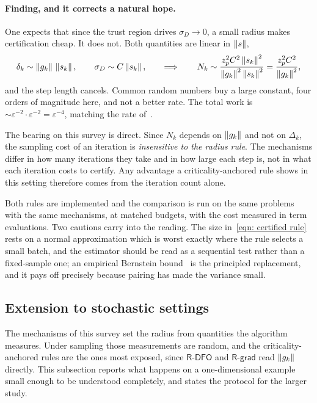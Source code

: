 \documentclass[11pt]{article}
\theoremstyle{plain}
\theoremstyle{definition}
\theoremstyle{remark}
\numberwithin{equation}{section}
\newcommand{\Rdfo}{\textsf{R-DFO}}
\newcommand{\Rgrad}{\textsf{R-grad}}
\begin{document}
\paragraph{Finding, and it corrects a natural hope.}
One expects that since the trust region drives $\sigma_D \to 0$, a small radius makes
certification cheap. It does not. Both quantities are linear in $\left \lVert s \right \rVert$,
\begin{equation}
  \delta_k \sim \left \lVert g_k \right \rVert\,\left \lVert s_k \right \rVert ,
  \qquad
  \sigma_D \sim C \left \lVert s_k \right \rVert ,
  \qquad\Longrightarrow\qquad
  N_k \sim \frac{z_p^2 C^2 \left \lVert s_k \right \rVert^2}{\left \lVert g_k \right \rVert^2 \left \lVert s_k \right \rVert^2}
        = \frac{z_p^2 C^2}{\left \lVert g_k \right \rVert^2} ,
  \label{eqn: N cancels}
\end{equation}
and the step length cancels. Common random numbers buy a large constant, four orders of magnitude
here, and not a better rate. The total work is $\sim \varepsilon^{-2} \cdot \varepsilon^{-2} =
\varepsilon^{-4}$, matching the rate of~\citet{BlanchetCartisMenickellyScheinberg19}.

The bearing on this survey is direct. Since $N_k$ depends on $\left \lVert g_k \right \rVert$ and not on $\Delta_k$,
the sampling cost of an iteration is \emph{insensitive to the radius rule}. The mechanisms differ
in how many iterations they take and in how large each step is, not in what each iteration costs
to certify. Any advantage a criticality-anchored rule shows in this setting therefore comes from
the iteration count alone.


Both rules are implemented and the comparison is run on the same problems with
the same mechanisms, at matched budgets, with the cost measured in term
evaluations.\provisional{} Two cautions carry into the reading. The size
in~\eqref{eqn: certified rule} rests on a normal approximation which is worst
exactly where the rule selects a small batch, and the estimator should be read as
a sequential test rather than a fixed-sample one; an empirical Bernstein
bound~\citep{MaurerPontil09} is the principled replacement, and it pays off
precisely because pairing has made the variance small.

\subsection{Extension to stochastic settings}
\label{sec: exp stochastic}

The mechanisms of this survey set the radius from quantities the algorithm measures. Under
sampling those measurements are random, and the criticality-anchored rules are the ones most
exposed, since $\Rdfo$ and $\Rgrad$ read $\left \lVert g_k \right \rVert$ directly. This subsection reports what
happens on a one-dimensional example small enough to be understood completely, and states the
protocol for the larger study.
\end{document}
